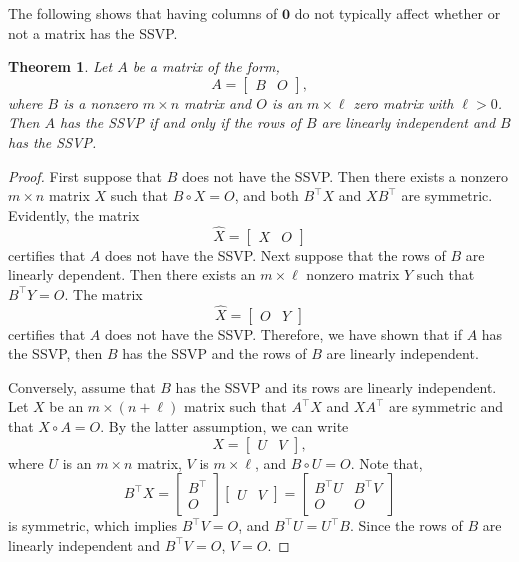 \documentclass[preprint,12pt]{elsarticle}
\newcommand{\trans  }{^\top}
\newtheorem{theorem}{Theorem}[section]
\begin{document}
The following shows that having columns of $\mathbf 0$ do not typically affect whether or not a matrix has the SSVP. 
\begin{theorem}
\label{border}
    Let $A$ be a matrix of the form,
    \[ 
A= \left[ \begin{array}{c|c} 
B & O
\end{array} 
\right], 
\]
where $B$ is a nonzero $m \times n$ matrix and $O$ is an $m \times \ell$ zero matrix with $\ell >  0$. Then  $A$ has the SSVP if and only if the rows of $B$ are linearly independent and  $B$ has the SSVP.
\end{theorem}

\begin{proof}
    First suppose that $B$ does not have the SSVP.  Then there exists a nonzero $m\times n$ matrix 
    $X$ such that $B\circ X=O$, and both $B\trans X$ and $XB\trans$ are symmetric.
    Evidently, the matrix
    \[ \widehat{X} = \left[ \begin{array}{c|c} X & O \end{array}\right]
    \] 
    certifies that $A$ does not have the SSVP. Next suppose that the rows of $B$ are linearly dependent. Then there exists an $m \times \ell $ nonzero matrix $Y$ such that $B\trans Y=O$.  The matrix 
    \[ \widehat{X} = \left[ \begin{array}{c|c} O & Y\end{array}\right]
    \] 
    certifies that $A$ does not have the SSVP.  Therefore, we have shown that if $A$ has the SSVP, then $B$ has the SSVP and the rows of 
    $B$ are linearly independent. 
    
    Conversely, assume that  $B$ has the SSVP and its rows are linearly independent. Let $X$ be an $m \times (n + \ell)$ matrix such that $A\trans  X$ and $XA\trans $ are symmetric and that $X \circ A = O$. By the latter assumption, we can write
        \[ 
X = \left[ \begin{array}{c|c} 
U & V
\end{array} 
\right],
\] where $U$ is an $m\times n$ matrix,  $V$ is $m \times \ell$, and $B \circ U= O$. Note that,
    \[ 
B\trans  X = \left[ \begin{array}{c} 
B\trans   \\
\hline
O
\end{array} 
\right]\left[ \begin{array}{c|c} 
U & V
\end{array} 
\right]
 = 
\left[ \begin{array}{c|c} 
B\trans  U & B\trans  V\\
\hline
O & O
\end{array} 
\right]
\] is symmetric, which implies $B\trans  V = O$, and $B\trans  U = U\trans  B$. Since the rows of  $B$ are linearly independent and $B\trans V = O$, $V=O$.


\end{proof}
\end{document}

